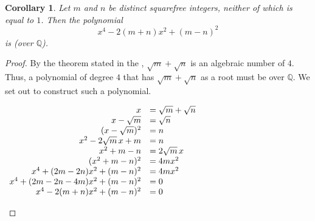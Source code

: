 \documentclass[12pt]{article}
\newtheorem*{cor*}{Corollary}
\begin{document}
\begin{cor*}
Let $m$ and $n$ be distinct squarefree integers, neither of which is equal to $1$.  Then the polynomial
\[
x^4-2(m+n)x^2+(m-n)^2
\]
is  (over $\mathbb{Q}$).
\end{cor*}

\begin{proof}
By the theorem stated in the , $\sqrt{m}+\sqrt{n}$ is an algebraic number of  $4$.  Thus, a polynomial of degree $4$ that has $\sqrt{m}+\sqrt{n}$ as a root must be  over $\mathbb{Q}$.  We set out to construct such a polynomial.

\begin{center}
$\begin{array}{rl}
x & =\sqrt{m}+\sqrt{n} \\
x-\sqrt{m} & =\sqrt{n} \\
(x-\sqrt{m})^2 & =n \\
x^2-2\sqrt{m}\, x+m & =n \\
x^2+m-n & =2\sqrt{m}\, x \\
(x^2+m-n)^2 & =4mx^2 \\
x^4+(2m-2n)x^2+(m-n)^2 & =4mx^2 \\
x^4+(2m-2n-4m)x^2+(m-n)^2 & =0 \\
x^4-2(m+n)x^2+(m-n)^2 & =0 \qedhere
\end{array}$
\end{center}
\end{proof}
\end{document}
